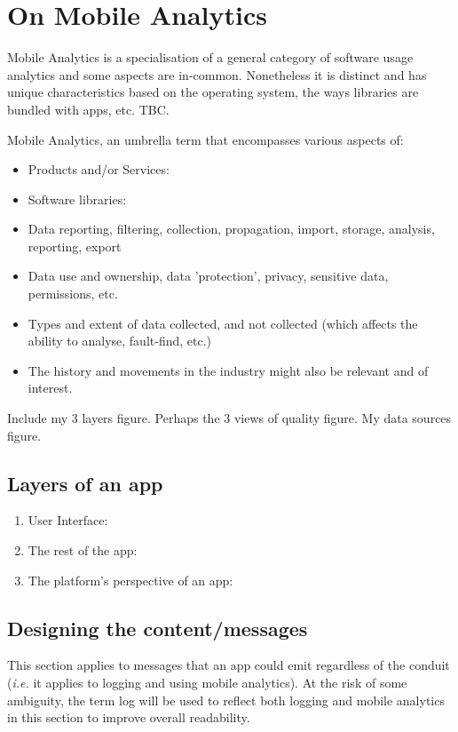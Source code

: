\chapter{On Mobile Analytics}
\label{appendix-on-mobile-analytics}

Mobile Analytics is a specialisation of a general category of software usage analytics and some aspects are in-common. Nonetheless it is distinct and has unique characteristics based on the operating system, the ways libraries are bundled with apps, etc. TBC.

Mobile Analytics, an umbrella term that encompasses various aspects of:
\begin{itemize}
    \item Products and/or Services:
    \item Software libraries:
    \item Data reporting, filtering, collection, propagation, import, storage, analysis, reporting, export
    \item Data use and ownership, data 'protection', privacy, sensitive data, permissions, etc.
    \item Types and extent of data collected, and not collected (which affects the ability to analyse, fault-find, etc.)
    \item The history and movements in the industry might also be relevant and of interest.
\end{itemize}

Include my 3 layers figure. Perhaps the 3 views of quality figure. My data sources figure. 

\section{Layers of an app}
\begin{enumerate}
    \item User Interface:
    \item The rest of the app:
    \item The platform's perspective of an app:
\end{enumerate}


\section{Designing the content/messages} 
This section applies to messages that an app could emit regardless of the conduit (\emph{i.e.} it applies to logging and using mobile analytics). At the risk of some ambiguity, the term log will be used to reflect both logging and mobile analytics in this section to improve overall readability.

